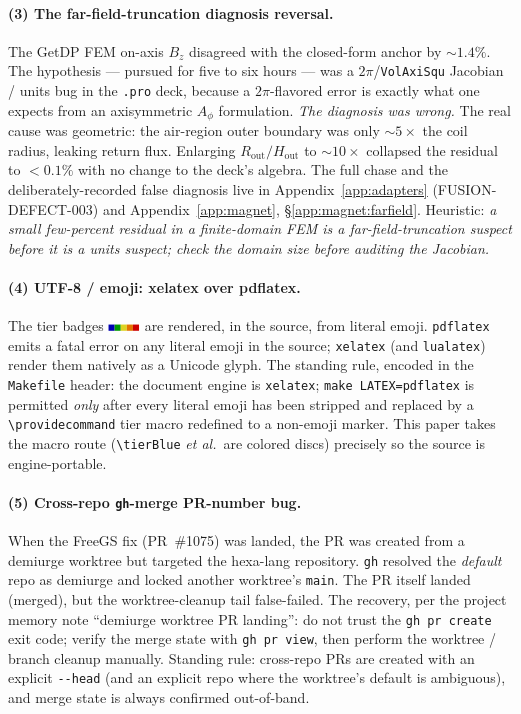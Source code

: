 \paragraph{(3) The far-field-truncation diagnosis reversal.}
The GetDP FEM on-axis $B_z$ disagreed with the closed-form anchor by
$\sim1.4\%$. The hypothesis --- pursued for five to six hours --- was a
$2\pi$/\texttt{VolAxiSqu} Jacobian / units bug in the \verb|.pro| deck,
because a $2\pi$-flavored error is exactly what one expects from an
axisymmetric $A_\phi$ formulation. \emph{The diagnosis was wrong.} The
real cause was geometric: the air-region outer boundary was only
$\sim5\times$ the coil radius, leaking return flux. Enlarging
$R_{\text{out}}/H_{\text{out}}$ to $\sim10\times$ collapsed the residual
to $<0.1\%$ with no change to the deck's algebra. The full chase and the
deliberately-recorded false diagnosis live in
Appendix~\ref{app:adapters} (FUSION-DEFECT-003) and
Appendix~\ref{app:magnet}, \S\ref{app:magnet:farfield}. Heuristic:
\emph{a small few-percent residual in a finite-domain FEM is a
far-field-truncation suspect before it is a units suspect; check the
domain size before auditing the Jacobian.}

\paragraph{(4) UTF-8 / emoji: xelatex over pdflatex.}
The tier badges $\tierBlue\tierGreen\tierYellow\tierOrange\tierRed$ are
rendered, in the source, from literal emoji. \texttt{pdflatex} emits a
fatal error on any literal emoji in the source; \texttt{xelatex}
(and \texttt{lualatex}) render them natively as a Unicode glyph. The
standing rule, encoded in the \texttt{Makefile} header: the document
engine is \texttt{xelatex}; \texttt{make LATEX=pdflatex} is permitted
\emph{only} after every literal emoji has been stripped and replaced by a
\verb|\providecommand| tier macro redefined to a non-emoji marker. This
paper takes the macro route (\verb|\tierBlue| \emph{et al.}\ are colored
discs) precisely so the source is engine-portable.

\paragraph{(5) Cross-repo \texttt{gh}-merge PR-number bug.}
When the FreeGS fix (PR~\#1075) was landed, the PR was created from a
demiurge worktree but targeted the hexa-lang repository.
\texttt{gh} resolved the \emph{default} repo as demiurge and locked
another worktree's \texttt{main}. The PR itself landed (merged), but the
worktree-cleanup tail false-failed. The recovery, per the project memory
note ``demiurge worktree PR landing'': do not trust the
\texttt{gh pr create} exit code; verify the merge state with
\texttt{gh pr view}, then perform the worktree / branch cleanup
manually. Standing rule: cross-repo PRs are created with an explicit
\verb|--head| (and an explicit repo where the worktree's default is
ambiguous), and merge state is always confirmed out-of-band.

